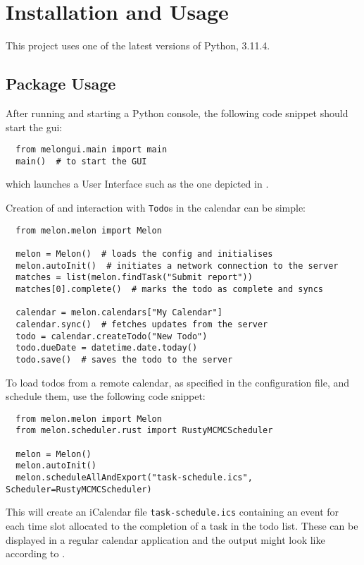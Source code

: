 \section{Installation and Usage}
This project uses one of the latest versions of Python, 3.11.4.

\subsection{Package Usage}
After running  and starting a Python console, the following code snippet should start the \gls{gui}:

\begin{verbatim}
  from melongui.main import main
  main()  # to start the GUI
\end{verbatim}

which launches a User Interface such as the one depicted in .

Creation of and interaction with \texttt{Todo}s in the calendar can be simple:

\begin{verbatim}
  from melon.melon import Melon

  melon = Melon()  # loads the config and initialises
  melon.autoInit()  # initiates a network connection to the server
  matches = list(melon.findTask("Submit report"))
  matches[0].complete()  # marks the todo as complete and syncs

  calendar = melon.calendars["My Calendar"]
  calendar.sync()  # fetches updates from the server
  todo = calendar.createTodo("New Todo")
  todo.dueDate = datetime.date.today()
  todo.save()  # saves the todo to the server
\end{verbatim}

To load todos from a remote calendar, as specified in the configuration file, and schedule them, use the following code snippet:
\begin{verbatim}
  from melon.melon import Melon
  from melon.scheduler.rust import RustyMCMCScheduler

  melon = Melon()
  melon.autoInit()
  melon.scheduleAllAndExport("task-schedule.ics", Scheduler=RustyMCMCScheduler)
\end{verbatim}

This will create an iCalendar file \texttt{task-schedule.ics} containing an event for each time slot allocated to the completion of a task in the todo list.
These can be displayed in a regular calendar application and the output might look like according to .

